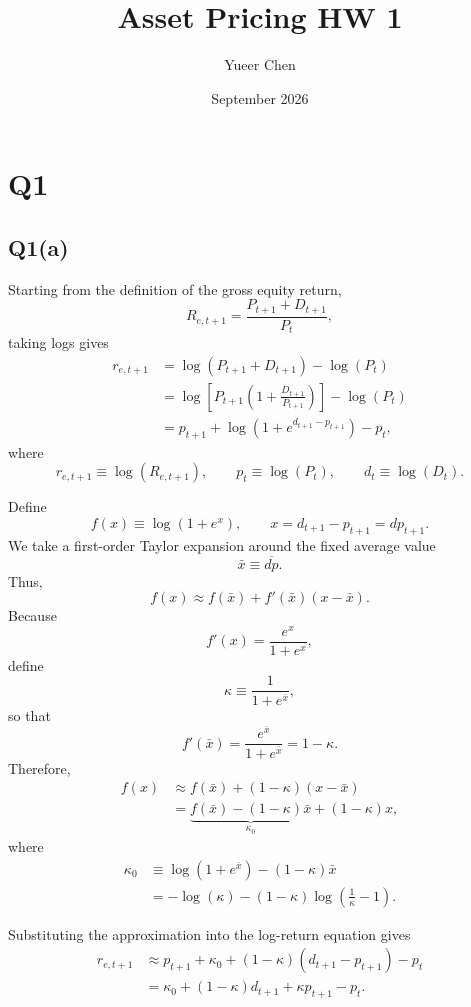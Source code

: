 \documentclass{article}
\title{Asset Pricing HW 1}
\author{Yueer Chen}
\date{September 2026}
\begin{document}
\maketitle

\section{Q1}

\subsection{Q1(a)}


Starting from the definition of the gross equity return,
\[
R_{e,t+1}
=
\frac{P_{t+1}+D_{t+1}}{P_t},
\]
taking logs gives
\begin{align*}
r_{e,t+1}
&=
\log(P_{t+1}+D_{t+1})-\log(P_t) \\
&=
\log\left[
P_{t+1}
\left(
1+\frac{D_{t+1}}{P_{t+1}}
\right)
\right]
-\log(P_t) \\
&=
p_{t+1}
+\log\left(1+e^{d_{t+1}-p_{t+1}}\right)
-p_t,
\end{align*}
where
\[
r_{e,t+1}\equiv\log(R_{e,t+1}),
\qquad
p_t\equiv\log(P_t),
\qquad
d_t\equiv\log(D_t).
\]

Define
\[
f(x)\equiv\log(1+e^x),
\qquad
x=d_{t+1}-p_{t+1}=dp_{t+1}.
\]
We take a first-order Taylor expansion around the fixed average value
\[
\bar{x}\equiv\overline{dp}.
\]
Thus,
\[
f(x)
\approx
f(\bar{x})+f'(\bar{x})(x-\bar{x}).
\]
Because
\[
f'(x)=\frac{e^x}{1+e^x},
\]
define
\[
\kappa\equiv\frac{1}{1+e^{\bar{x}}},
\]
so that
\[
f'(\bar{x})
=
\frac{e^{\bar{x}}}{1+e^{\bar{x}}}
=
1-\kappa.
\]
Therefore,
\begin{align*}
f(x)
&\approx
f(\bar{x})+(1-\kappa)(x-\bar{x}) \\
&=
\underbrace{
f(\bar{x})-(1-\kappa)\bar{x}
}_{\kappa_0}
+(1-\kappa)x,
\end{align*}
where
\begin{align*}
\kappa_0
&\equiv
\log(1+e^{\bar{x}})
-(1-\kappa)\bar{x} \\
&=
-\log(\kappa)
-(1-\kappa)\log\left(\frac{1}{\kappa}-1\right).
\end{align*}

Substituting the approximation into the log-return equation gives
\begin{align*}
r_{e,t+1}
&\approx
p_{t+1}
+\kappa_0
+(1-\kappa)(d_{t+1}-p_{t+1})
-p_t \\
&=
\kappa_0
+(1-\kappa)d_{t+1}
+\kappa p_{t+1}
-p_t.
\end{align*}
\end{document}
